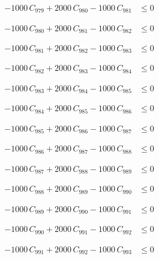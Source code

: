 \documentclass[a4paper,11pt]{article}
\begin{document}
\begin{align}
-1000\,C_{979} + 2000\,C_{980} - 1000\,C_{981} &\leq 0 \nonumber
\end{align}

\begin{align}
-1000\,C_{980} + 2000\,C_{981} - 1000\,C_{982} &\leq 0 \nonumber
\end{align}

\begin{align}
-1000\,C_{981} + 2000\,C_{982} - 1000\,C_{983} &\leq 0 \nonumber
\end{align}

\begin{align}
-1000\,C_{982} + 2000\,C_{983} - 1000\,C_{984} &\leq 0 \nonumber
\end{align}

\begin{align}
-1000\,C_{983} + 2000\,C_{984} - 1000\,C_{985} &\leq 0 \nonumber
\end{align}

\begin{align}
-1000\,C_{984} + 2000\,C_{985} - 1000\,C_{986} &\leq 0 \nonumber
\end{align}

\begin{align}
-1000\,C_{985} + 2000\,C_{986} - 1000\,C_{987} &\leq 0 \nonumber
\end{align}

\begin{align}
-1000\,C_{986} + 2000\,C_{987} - 1000\,C_{988} &\leq 0 \nonumber
\end{align}

\begin{align}
-1000\,C_{987} + 2000\,C_{988} - 1000\,C_{989} &\leq 0 \nonumber
\end{align}

\begin{align}
-1000\,C_{988} + 2000\,C_{989} - 1000\,C_{990} &\leq 0 \nonumber
\end{align}

\begin{align}
-1000\,C_{989} + 2000\,C_{990} - 1000\,C_{991} &\leq 0 \nonumber
\end{align}

\begin{align}
-1000\,C_{990} + 2000\,C_{991} - 1000\,C_{992} &\leq 0 \nonumber
\end{align}

\begin{align}
-1000\,C_{991} + 2000\,C_{992} - 1000\,C_{993} &\leq 0 \nonumber
\end{align}
\end{document}
